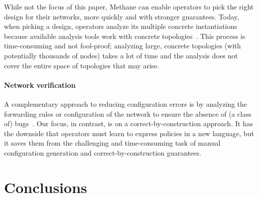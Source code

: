 \documentclass[numbers, 10pt, preprint]{sigplanconf}
\newcommand{\sysname}{{\small \sf Methane}\xspace}
\newcommand{\para}[1]{\paragraph*{\textbf{#1}}}
\begin{document}
While not the focus of this paper, \sysname can enable operators to pick the right design for their networks, more quickly and with stronger guarantees. Today, when picking a design, operators analyze its multiple concrete instantiations because available analysis tools work with concrete topologies~\cite{condor}. This process is time-consuming and not fool-proof; analyzing large, concrete topologies (with potentially thousands of nodes) takes a lot of time and the analysis does not cover the entire space of topologies that may arise.

\para{Network verification}
A complementary approach to reducing configuration errors is by analyzing the forwarding rules or configuration of the network to ensure the absence of (a class of) bugs~\cite{anteater,hsa,veriflow,feamster+:rcc,ipassure,batfish,bagpipe,arc,era,surgery}. Our focus, in contrast, is on a correct-by-construction approach. It has the downside that operators must learn to express policies in a new language, but it saves them from the challenging and time-consuming task of manual configuration generation and correct-by-construction guarantees.





%
%
%
%

\section{Conclusions}
\label{sec:conclusions}
\end{document}
